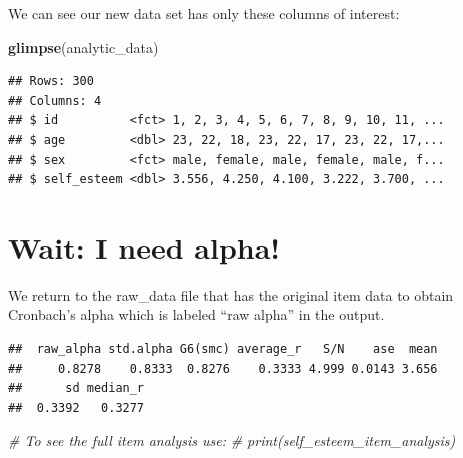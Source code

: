 \documentclass[
]{krantz}
\makeatletter
\newenvironment{Shaded}{\begin{snugshade}}{\end{snugshade}}
\newcommand{\CommentTok}[1]{\textcolor[rgb]{0.37,0.37,0.37}{\textit{#1}}}
\newcommand{\KeywordTok}[1]{\textcolor[rgb]{0.27,0.27,0.27}{\textbf{#1}}}
\newcommand{\NormalTok}[1]{#1}
\newcommand{\OperatorTok}[1]{\textcolor[rgb]{0.43,0.43,0.43}{\textbf{#1}}}
\newcommand{\StringTok}[1]{\textcolor[rgb]{0.5,0.5,0.5}{#1}}
\newenvironment{kframe}{%
\medskip{}
\setlength{\fboxsep}{.8em}
 \def\at@end@of@kframe{}%
 \ifinner\ifhmode%
  \def\at@end@of@kframe{\end{minipage}}%
  \begin{minipage}{\columnwidth}%
 \fi\fi%
 \def\FrameCommand##1{\hskip\@totalleftmargin \hskip-\fboxsep
 \colorbox{shadecolor}{##1}\hskip-\fboxsep
     \hskip-\linewidth \hskip-\@totalleftmargin \hskip\columnwidth}%
 \MakeFramed {\advance\hsize-\width
   \@totalleftmargin\z@ \linewidth\hsize
   \@setminipage}}%
 {\par\unskip\endMakeFramed%
 \at@end@of@kframe}
\renewenvironment{Shaded}{\begin{kframe}}{\end{kframe}}
\makeatother
\begin{document}
We can see our new data set has only these columns of interest:

\begin{Shaded}
\begin{Highlighting}[]
\KeywordTok{glimpse}\NormalTok{(analytic_data)}
\end{Highlighting}
\end{Shaded}

\begin{verbatim}
## Rows: 300
## Columns: 4
## $ id          <fct> 1, 2, 3, 4, 5, 6, 7, 8, 9, 10, 11, ...
## $ age         <dbl> 23, 22, 18, 23, 22, 17, 23, 22, 17,...
## $ sex         <fct> male, female, male, female, male, f...
## $ self_esteem <dbl> 3.556, 4.250, 4.100, 3.222, 3.700, ...
\end{verbatim}

\hypertarget{wait-i-need-alpha}{%
\section{Wait: I need alpha!}\label{wait-i-need-alpha}}

We return to the raw\_data file that has the original item data to obtain Cronbach's alpha which is labeled ``raw alpha'' in the output.

\begin{Shaded}
\end{Shaded}

\begin{verbatim}
##  raw_alpha std.alpha G6(smc) average_r   S/N    ase  mean
##     0.8278    0.8333  0.8276    0.3333 4.999 0.0143 3.656
##      sd median_r
##  0.3392   0.3277
\end{verbatim}

\begin{Shaded}
\begin{Highlighting}[]
\CommentTok{# To see the full item analysis use:}
\CommentTok{# print(self_esteem_item_analysis)}
\end{Highlighting}
\end{Shaded}
\end{document}
